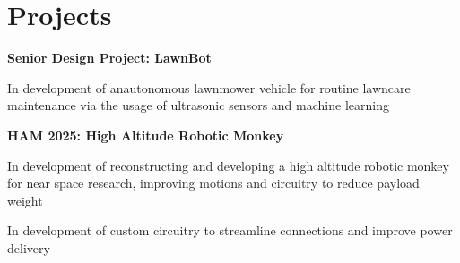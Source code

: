 \section{Projects}
    

    \vspace{0.2 cm}

    \begin{twocolentry}{}
        \textbf{Senior Design Project: LawnBot}
    \end{twocolentry}

    \vspace{0.10 cm}
    \begin{onecolentry}
        \begin{highlights}
            \item In development of anautonomous lawnmower vehicle for routine lawncare maintenance via the usage of ultrasonic sensors and machine learning
        \end{highlights}
    \end{onecolentry}
    
    \vspace{0.2 cm}

    \begin{twocolentry}{
        
    }
        \textbf{HAM 2025: High Altitude Robotic Monkey}\end{twocolentry}

    \vspace{0.10 cm}
    \begin{onecolentry}
        \begin{highlights}
            \item In development of reconstructing and developing a high altitude robotic monkey for near space research, improving motions and circuitry to reduce payload weight
            \item In development of custom circuitry to streamline connections and improve power delivery
        \end{highlights}
    \end{onecolentry}

